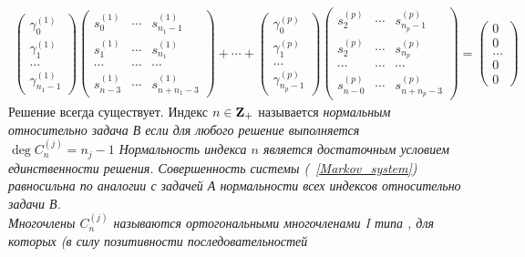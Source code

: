 \begin{eqnarray}
\left(
\begin{array}{cccccccc}
\gamma_0^{(1)} \\ \gamma_1^{(1)} \\ \ldots \\
\gamma_{n_1-1}^{(1)}
\end{array}
\right) \left(
\begin{array}{ccccccccccc}
s_0^{(1)}       & \cdots        & s_{n_1-1}^{(1)}     \\
s_1^{(1)}       & \cdots        & s_{n_1}^{(1)} \\
\cdots          & \cdots        & \cdots  \\
s_{n-3}^{(1)}   & \cdots        & s_{n+n_1-3}^{(1)}
\end{array} \right)
+\cdots+ \left(
\begin{array}{cccccccc}
\gamma_0^{(p)} \\ \gamma_1^{(p)} \\ \ldots \\
\gamma_{n_p-1}^{(p)}
\end{array}
\right) \left(
\begin{array}{ccccccccccc}
s_2^{(p)}       & \cdots        & s_{n_p-1}^{(p)}     \\
s_2^{(p)}       & \cdots        & s_{n_p}^{(p)} \\
\cdots          & \cdots        & \cdots  \\
s_{n-0}^{(p)}   & \cdots        & s_{n+n_p-3}^{(p)}
\end{array} \right)
= \left(
\begin{array}{cccccccc}
0 \\ 0 \\ \ldots \\ 0 \\ 0
\end{array}
\right) \nonumber
\end{eqnarray}
Решение всегда существует. Индекс $n\in \bf Z \rm _{+}$ называется
\it нормальным относительно задача В \rm если для любого решение
выполняется $\deg  C_n^{(j)} = n_j-1$ Нормальность индекса $n$
является достаточным условием единственности решения.
Совершенность системы (~\ref{Markov_system}) равносильна по
аналогии с задачей А
нормальности всех индексов относительно задачи В. \\
Многочлены $C^{(j)}_n$ называются \it ортогональными многочленами
I типа \rm , для которых (в силу позитивности последовательностей
